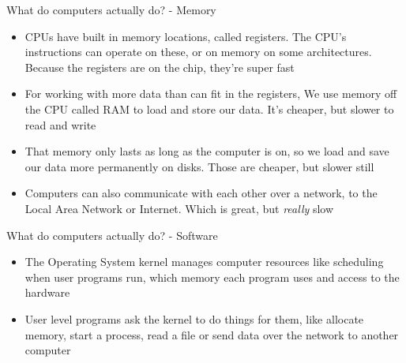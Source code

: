 \documentclass{beamer}
\begin{document}
\begin{frame}{What do computers actually do? - Memory}
	\begin{itemize}
		\item CPUs have built in memory locations, called registers. The CPU's instructions
			can operate on these, or on memory on some architectures. Because the registers are on the chip, they're super fast
		\item For working with more data than can fit in the registers, We use memory off the CPU called RAM to load and store our data. It's cheaper, but slower to read and write
		\item That memory only lasts as long as the computer is on, so we load and save our data more permanently on disks. Those are cheaper, but slower still
		\item Computers can also communicate with each other over a network, to the Local
			Area Network or Internet. Which is great, but \emph{really} slow
	\end{itemize}
\end{frame}


\begin{frame}{What do computers actually do? - Software}
	\begin{itemize}
		\item The Operating System kernel manages computer resources like scheduling when
			user programs run, which memory each program uses and access to the hardware
		\item User level programs ask the kernel to do things for
			them, like allocate memory, start a process, read a file or send data over the
			network to another computer
	\end{itemize}
\end{frame}
\end{document}
